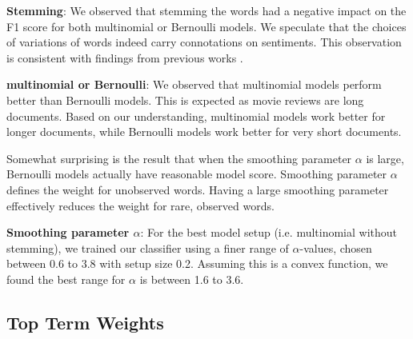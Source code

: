 \documentclass{article}
\begin{document}
\textbf{Stemming}: We observed that stemming the words had a negative impact on the F1 score for both multinomial or Bernoulli models. We speculate that the choices of variations of words indeed carry connotations on sentiments. This observation is consistent with findings from previous works \cite{stanford-tutorial, sentiment-twitter}.

\textbf{multinomial or Bernoulli}: We observed that multinomial models perform better than Bernoulli models. This is expected as movie reviews are long documents. Based on our understanding, multinomial models work better for longer documents, while Bernoulli models work better for very short documents.

Somewhat surprising is the result that when the smoothing parameter \(\alpha\) is large, Bernoulli models actually have reasonable model score. Smoothing parameter \(\alpha\) defines the weight for unobserved words. Having a large smoothing parameter effectively reduces the weight for rare, observed words.

\textbf{Smoothing parameter \(\alpha\)}: For the best model setup (i.e. multinomial without stemming), we trained our classifier using a finer range of \(\alpha\)-values, chosen between 0.6 to 3.8 with setup size 0.2. Assuming this is a convex function, we found the best range for \(\alpha\) is between 1.6 to 3.6. 


\subsection{Top Term Weights}
\label{sec:TopWords}

\end{document}
